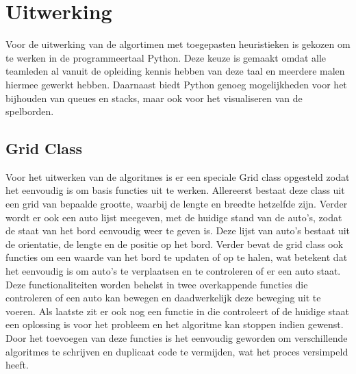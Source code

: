 \documentclass[a4paper]{article}
\begin{document}
\section{Uitwerking}
Voor de uitwerking van de algortimen met toegepasten heuristieken is gekozen om te werken in de programmeertaal Python. Deze keuze is gemaakt omdat alle teamleden al vanuit de opleiding kennis hebben van deze taal en meerdere malen hiermee gewerkt hebben. Daarnaast biedt Python genoeg mogelijkheden voor het bijhouden van queues en stacks, maar ook voor het visualiseren van de spelborden.

\subsection{Grid Class}
Voor het uitwerken van de algoritmes is er een speciale Grid class opgesteld zodat het eenvoudig is om basis functies uit te werken. Allereerst bestaat deze class uit een grid van bepaalde grootte, waarbij de lengte en breedte hetzelfde zijn. Verder wordt er ook een auto lijst meegeven, met de huidige stand van de auto's, zodat de staat van het bord eenvoudig weer te geven is. Deze lijst van auto's bestaat uit de orientatie, de lengte en de positie op het bord. Verder bevat de grid class ook functies om een waarde van het bord te updaten of op te halen, wat betekent dat het eenvoudig is om auto's te verplaatsen en te controleren of er een auto staat. Deze functionaliteiten worden behelst in twee overkappende functies die controleren of een auto kan bewegen en daadwerkelijk deze beweging uit te voeren. Als laatste zit er ook nog een functie in die controleert of de huidige staat een oplossing is voor het probleem en het algoritme kan stoppen indien gewenst. Door het toevoegen van deze functies is het eenvoudig geworden om verschillende algoritmes te schrijven en duplicaat code te vermijden, wat het proces versimpeld heeft.
\end{document}
